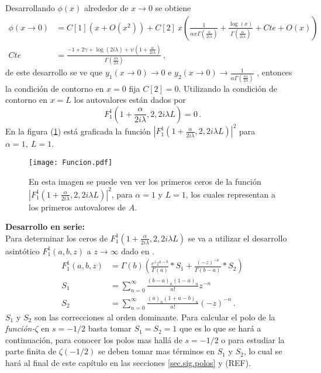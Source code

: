 Desarrollando $\phi (x)$ alrededor de $x \rightarrow 0$ se obtiene
\begin{align}
\phi (x \rightarrow 0) &=
C[1] ( x + O(x ^2)) + 
C[2] \ x 
\left( 
\frac{1}{  \alpha x  \Gamma ( \frac{ \alpha}{2 i \lambda}  )   }  +
\frac{\log (x) }{\Gamma ( \frac{ \alpha}{2 i \lambda} ) } + Cte + O(x)
\right)
	\nonumber
\\[10pt]
Cte &= 
\frac{
-1 + 2 \gamma + \log ( 2  i \lambda ) + \psi (1 + \frac{ \alpha}{2 i \lambda})
}
{\Gamma (\frac{i \alpha}{2 \lambda})}
\, ,
\label{eq.scat}
\end{align}
de este desarrollo se ve que $y _1 (x \rightarrow 0 ) \rightarrow 0$ e $y _2 (x \rightarrow 0)  \rightarrow
\frac{1}{  \alpha   \Gamma ( \frac{i \alpha}{2 \lambda}  )   } $ , entonces la condición de contorno en $x=0$ fija $C[2] =0$.
Utilizando la condición de contorno en $x=L$ los autovalores están dados por
\begin{equation}
F _1 ^1 (1+\frac{ \alpha}{2 i \lambda},2,2 i \lambda L)  = 0
	\, .
\label{eq.1}
\end{equation}
En la figura (\ref{fig:funcion}) está graficada la función  
\mbox{$ | F _1 ^1 (1+\frac{ \alpha}{2 i \lambda},2,2 i \lambda L) | ^2 $} para   $\alpha=1, \ L=1$. \\

\begin{figure}[h!]
\centering
\texttt{[image: Funcion.pdf]}
\caption{En esta imagen se puede ven ver los primeros ceros de la función $| F _1 ^1 (1+\frac{ \alpha}{2 i \lambda},2,2 i \lambda L) | ^2$, para $\alpha=1$ y $L=1$, los cuales representan a los primeros autovalores de $A$.}
\label{fig:funcion}
\end{figure}

\textbf{Desarrollo en serie:} \\

Para determinar los ceros de $F _1 ^1 (1+\frac{ \alpha}{2 i \lambda},2,2 i \lambda L) $ se va a utilizar el desarrollo asintótico $F _1 ^1 (a,b,z)$ a $z \rightarrow \infty$ dado en \cite{Abramowitz:hyper}.
\begin{equation}
\begin{aligned}
    F _1 ^1 (a,b,z) &= \Gamma (b) 
    \left(
    \frac{e^z z ^{a-b} }{\Gamma(a)} * S_1 + \frac{(-z) ^{ -a}}{ \Gamma(b-a)} 
    * S_2
    \right) \\[5pt]
    S _1 &= \sum _{n=0} ^{\infty} \frac{(b-a) _n (1-a) _n}{n!} z ^{-n} \\[5pt]
    S _2 &= \sum _{n=0} ^{\infty} \frac{(a) _n (1+a-b) _n}{n!} (-z) ^{-n}     
		\, .
\end{aligned}
\label{eq.aprox}
\end{equation}
$S_1$ y $S _2$ son las correcciones al orden dominante. Para calcular el polo de la {\it función-$\zeta$} en $s=-1/2$ basta tomar $S _1 = S _2 = 1$ que es lo que se hará a continuación, para conocer los polos mas hallá de $s=-1/2$ o para estudiar la parte finita de $\zeta (-1/2)$ se deben tomar mas términos en $S_1$ y $S _2$, lo cual se hará al final de este capítulo en las secciones \ref{sec.sig.polos} y (REF).

